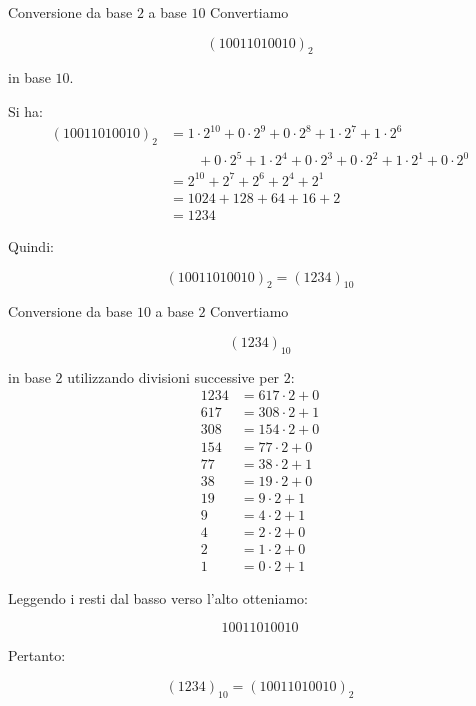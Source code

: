 \documentclass{article}
\begin{document}
\begin{ex}{Conversione da base $2$ a base $10$}{}
    Convertiamo

    $$
        (10011010010)_2
    $$

    in base $10$.

    Si ha:
    \begin{align*}
        (10011010010)_2
         & =
        1\cdot2^{10}
        +0\cdot2^9
        +0\cdot2^8
        +1\cdot2^7
        +1\cdot2^6             \\
         & \qquad
        +0\cdot2^5
        +1\cdot2^4
        +0\cdot2^3
        +0\cdot2^2
        +1\cdot2^1
        +0\cdot2^0             \\
         & =
        2^{10}+2^7+2^6+2^4+2^1 \\
         & =
        1024+128+64+16+2       \\
         & =
        1234
    \end{align*}

    Quindi:

    $$
        \boxed{(10011010010)_2=(1234)_{10}}
    $$

\end{ex}

\begin{ex}{Conversione da base $10$ a base $2$}{}
    Convertiamo

    $$
        (1234)_{10}
    $$

    in base $2$ utilizzando divisioni successive per $2$:
    \begin{align*}
        1234 & =617\cdot2+0 \\
        617  & =308\cdot2+1 \\
        308  & =154\cdot2+0 \\
        154  & =77\cdot2+0  \\
        77   & =38\cdot2+1  \\
        38   & =19\cdot2+0  \\
        19   & =9\cdot2+1   \\
        9    & =4\cdot2+1   \\
        4    & =2\cdot2+0   \\
        2    & =1\cdot2+0   \\
        1    & =0\cdot2+1
    \end{align*}

    Leggendo i resti dal basso verso l'alto otteniamo:

    $$
        10011010010
    $$

    Pertanto:

    $$
        \boxed{(1234)_{10}=(10011010010)_2}
    $$

\end{ex}
\end{document}
